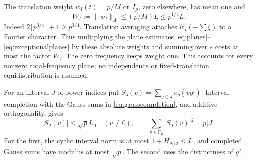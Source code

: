 \documentclass[10pt]{amsart}
\theoremstyle{remark}
\newcommand{\Fp}{\mathbb F_p}
\newcommand{\normA}[1]{\lVert #1\rVert_A}
\begin{document}
The translation weight $w_I(t)=p/M$ on $I_p$, zero elsewhere, has
mean one and
\begin{equation}\label{eq:weightnorm}
 W_I:=\normA{w_I}\le(p/M)L\le p^{1/4}L.
\end{equation}
Indeed $2\lfloor p^{3/4}\rfloor+1\ge p^{3/4}$.
Translation averaging attaches $\widehat w_I(-\sum\xi)$ to a
Fourier character. Thus multiplying the plane estimates
\eqref{eq:planes}--\eqref{eq:exceptionalplanes} by these absolute
weights and summing over $s$ costs at most the factor $W_I$.
The zero frequency keeps weight one. This accounts for every
nonzero total-frequency plane; no independence or fixed-translation
equidistribution is assumed.

For an interval $J$ of power indices put
$S_J(v)=\sum_{j\in J}e_p(vg^j)$. Interval completion with the Gauss
sums in \eqref{eq:gausscompletion}, and additive orthogonality, gives
\begin{equation}\label{eq:incomplete}
 |S_J(v)|\le\sqrt p L_0\quad(v\ne0),\qquad
 \sum_{v\in\Fp}|S_J(v)|^2=p|J|.
\end{equation}
For the first, the cyclic interval norm is at most
$1+H_{N/2}\le L_0$ and completed Gauss sums have modulus at most
$\sqrt p$. The second uses the distinctness of $g^j$.
\end{document}

